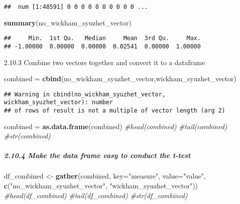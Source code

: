 \documentclass[]{article}
\newenvironment{Shaded}{\begin{snugshade}}{\end{snugshade}}
\newcommand{\CommentTok}[1]{\textcolor[rgb]{0.56,0.35,0.01}{\textit{#1}}}
\newcommand{\DataTypeTok}[1]{\textcolor[rgb]{0.13,0.29,0.53}{#1}}
\newcommand{\KeywordTok}[1]{\textcolor[rgb]{0.13,0.29,0.53}{\textbf{#1}}}
\newcommand{\NormalTok}[1]{#1}
\newcommand{\StringTok}[1]{\textcolor[rgb]{0.31,0.60,0.02}{#1}}
\let\oldsubparagraph\subparagraph
\renewcommand{\subparagraph}[1]{\oldsubparagraph{#1}\mbox{}}
\begin{document}
\begin{verbatim}
##  num [1:48591] 0 0 0 0 0 0 0 0 0 0 ...
\end{verbatim}

\begin{Shaded}
\begin{Highlighting}[]
\KeywordTok{summary}\NormalTok{(no_wickham_syuzhet_vector)}
\end{Highlighting}
\end{Shaded}

\begin{verbatim}
##     Min.  1st Qu.   Median     Mean  3rd Qu.     Max. 
## -1.00000  0.00000  0.00000  0.02541  0.00000  1.00000
\end{verbatim}

2.10.3 Combine two vectors together and convert it to a dataframe

\begin{Shaded}
\begin{Highlighting}[]
\NormalTok{combined =}\StringTok{ }\KeywordTok{cbind}\NormalTok{(no_wickham_syuzhet_vector,wickham_syuzhet_vector)}
\end{Highlighting}
\end{Shaded}

\begin{verbatim}
## Warning in cbind(no_wickham_syuzhet_vector, wickham_syuzhet_vector): number
## of rows of result is not a multiple of vector length (arg 2)
\end{verbatim}

\begin{Shaded}
\begin{Highlighting}[]
\NormalTok{combined =}\StringTok{ }\KeywordTok{as.data.frame}\NormalTok{(combined)}
\CommentTok{#head(combined)}
\CommentTok{#tail(combined)}
\CommentTok{#str(combined)}
\end{Highlighting}
\end{Shaded}

\hypertarget{make-the-data-frame-easy-to-conduct-the-t-test}{%
\subparagraph{2.10.4 Make the data frame easy to conduct the
t-test}\label{make-the-data-frame-easy-to-conduct-the-t-test}}

\begin{Shaded}
\begin{Highlighting}[]
\NormalTok{df_combined <-}\StringTok{ }\KeywordTok{gather}\NormalTok{(combined, }\DataTypeTok{key=}\StringTok{"measure"}\NormalTok{, }\DataTypeTok{value=}\StringTok{"value"}\NormalTok{, }\KeywordTok{c}\NormalTok{(}\StringTok{"no_wickham_syuzhet_vector"}\NormalTok{, }\StringTok{"wickham_syuzhet_vector"}\NormalTok{))}
\CommentTok{#head(df_combined)}
\CommentTok{#tail(df_combined)}
\CommentTok{#str(df_combined)}
\end{Highlighting}
\end{Shaded}
\end{document}
